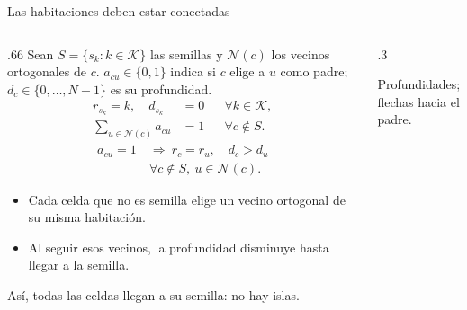 \documentclass[aspectratio=169,11pt]{beamer}
\newcommand{\examplegrid}{%
  \draw[step=1,ink!35] (0,0) grid (4,4);
  \draw[ink,thick] (0,0) rectangle (4,4);
}
\begin{document}
\begin{frame}{Las habitaciones deben estar conectadas}
  \begin{columns}[T,onlytextwidth]
  \begin{column}{.66\textwidth}
  \small
  Sean \(S=\{s_k:k\in\mathcal K\}\) las semillas y
  \(\mathcal N(c)\) los vecinos ortogonales de \(c\).
  \(a_{cu}\in\{0,1\}\) indica si \(c\) elige a \(u\) como padre;
  \(d_c\in\{0,\ldots,N-1\}\) es su profundidad.
  \[
    \begin{aligned}
      r_{s_k}=k,\quad d_{s_k}&=0 &&\forall k\in\mathcal K,\\
      \sum_{u\in\mathcal N(c)}a_{cu}&=1 &&\forall c\notin S.
    \end{aligned}
  \]
  \[
    \begin{aligned}
      a_{cu}=1\ &\Longrightarrow\ r_c=r_u,\quad d_c>d_u\\
      &\forall c\notin S,\ u\in\mathcal N(c).
    \end{aligned}
  \]
  \begin{itemize}
    \setlength{\itemsep}{2mm}
    \item Cada celda que no es semilla elige un vecino ortogonal
      de su misma habitaci\'on.
    \item Al seguir esos vecinos, la profundidad disminuye hasta
      llegar a la semilla.
  \end{itemize}
  \small As\'i, todas las celdas llegan a su semilla: no hay islas.
  \end{column}
  \begin{column}{.3\textwidth}
    \centering
    \par\smallskip\scriptsize Profundidades; flechas hacia el padre.
  \end{column}
  \end{columns}
\end{frame}
\end{document}
